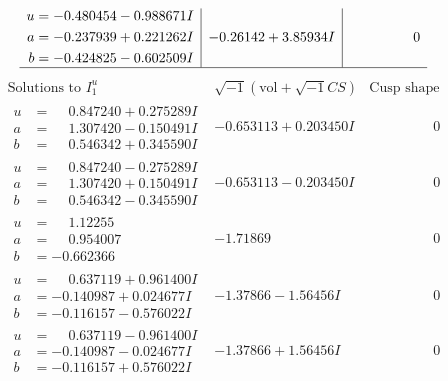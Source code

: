 \documentclass[1p]{elsarticle_modified}
\theoremstyle{definition}
\newcommand{\I}{\sqrt{-1}}
\begin{document}
$$\begin{array}{c|c|c}
\begin{aligned}
u &= -0.480454 - 0.988671 I \\
a &= -0.237939 + 0.221262 I \\
b &= -0.424825 - 0.602509 I\end{aligned}
 & -0.26142 + 3.85934 I & \phantom{-0.000000 } 0\\
 \hline 
 \end{array}$$\newpage$$\begin{array}{c|c|c}  
\text{Solutions to }I^u_{1}& \I (\text{vol} + \sqrt{-1}CS) & \text{Cusp shape}\\
 \hline 
\begin{aligned}
u &= \phantom{-}0.847240 + 0.275289 I \\
a &= \phantom{-}1.307420 - 0.150491 I \\
b &= \phantom{-}0.546342 + 0.345590 I\end{aligned}
 & -0.653113 + 0.203450 I & \phantom{-0.000000 } 0 \\ \hline\begin{aligned}
u &= \phantom{-}0.847240 - 0.275289 I \\
a &= \phantom{-}1.307420 + 0.150491 I \\
b &= \phantom{-}0.546342 - 0.345590 I\end{aligned}
 & -0.653113 - 0.203450 I & \phantom{-0.000000 } 0 \\ \hline\begin{aligned}
u &= \phantom{-}1.12255\phantom{ +0.000000I} \\
a &= \phantom{-}0.954007\phantom{ +0.000000I} \\
b &= -0.662366\phantom{ +0.000000I}\end{aligned}
 & -1.71869\phantom{ +0.000000I} & \phantom{-0.000000 } 0 \\ \hline\begin{aligned}
u &= \phantom{-}0.637119 + 0.961400 I \\
a &= -0.140987 + 0.024677 I \\
b &= -0.116157 - 0.576022 I\end{aligned}
 & -1.37866 - 1.56456 I & \phantom{-0.000000 } 0 \\ \hline\begin{aligned}
u &= \phantom{-}0.637119 - 0.961400 I \\
a &= -0.140987 - 0.024677 I \\
b &= -0.116157 + 0.576022 I\end{aligned}
 & -1.37866 + 1.56456 I & \phantom{-0.000000 } 0 \\ \hline\begin{aligned}

\end{aligned}
\end{array}$$
\end{document}
